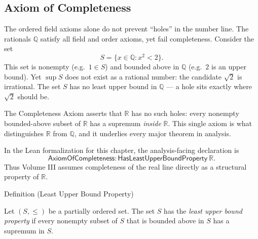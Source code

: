 \subsection{Axiom of Completeness}


\begin{remark*}[Interpretation]
The ordered field axioms alone do not prevent ``holes'' in the number line.
The rationals $\mathbb{Q}$ satisfy all field and order axioms, yet fail
completeness. Consider the set
\[
S = \{x \in \mathbb{Q} : x^2 < 2\}.
\]
This set is nonempty (e.g.\ $1 \in S$) and bounded above in $\mathbb{Q}$
(e.g.\ $2$ is an upper bound). Yet $\sup S$ does not exist as a rational
number: the candidate $\sqrt{2}$ is irrational. The set $S$ has no least
upper bound in $\mathbb{Q}$ --- a hole sits exactly where $\sqrt{2}$ should be.

The Completeness Axiom asserts that $\mathbb{R}$ has no such holes:
every nonempty bounded-above subset of $\mathbb{R}$ has a supremum
\emph{inside} $\mathbb{R}$.  This single axiom is what distinguishes
$\mathbb{R}$ from $\mathbb{Q}$, and it underlies every major theorem in
analysis.
\end{remark*}

\begin{remark*}
In the Lean formalization for this chapter, the analysis-facing declaration is
\[
  \mathsf{AxiomOfCompleteness} :
  \mathsf{HasLeastUpperBoundProperty}\ \mathbb{R}.
\]
Thus Volume III assumes completeness of the real line directly as a structural
property of $\mathbb{R}$.
\end{remark*}


\begin{definitionbox}{Definition (Least Upper Bound Property)}
\begin{definition}
\label{def:least-upper-bound-property}
Let $(S,\le)$ be a partially ordered set.  The set $S$ has the
\emph{least upper bound property} if every nonempty subset of $S$ that is
bounded above in $S$ has a supremum in $S$.
\end{definition}
\end{definitionbox}

